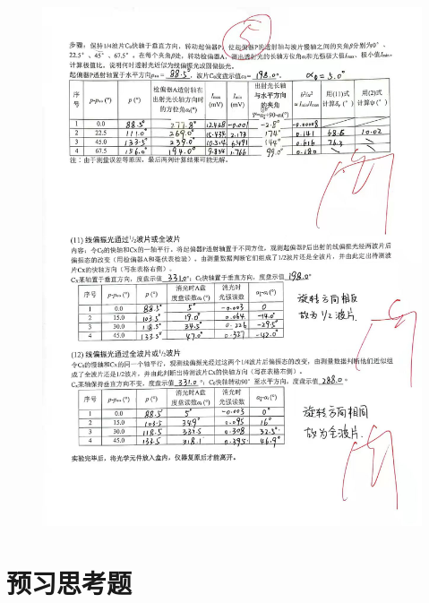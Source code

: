 \documentclass[UTF8]{ctexart}
\begin{document}
\begin{figure}[H]
  \centering
  \includegraphics[scale=0.35]{3.jpg}
\end{figure}









\section{预习思考题}
\end{document}
